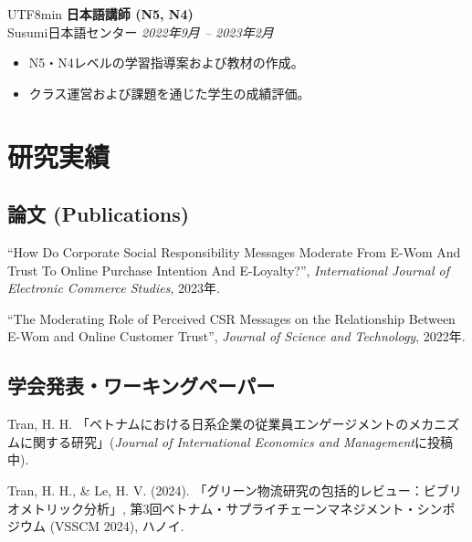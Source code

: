 \documentclass[10.5pt]{article}
\begin{document}
\begin{CJK}{UTF8}{min}
\textbf{日本語講師 (N5, N4)} \hfill \\
Susumi日本語センター \hfill \emph{2022年9月 -- 2023年2月}
\vspace{-0.5em}
\begin{itemize}
\item N5・N4レベルの学習指導案および教材の作成。
\item クラス運営および課題を通じた学生の成績評価。
\end{itemize}


\section{研究実績}

\subsection{論文 (Publications)}

\begin{enumerate}[label={[\arabic*]}]

\item ``How Do Corporate Social Responsibility Messages Moderate From E-Wom And Trust To Online Purchase Intention And E-Loyalty?'', \textit{International Journal of Electronic Commerce Studies}, 2023年.

\item ``The Moderating Role of Perceived CSR Messages on the Relationship Between E-Wom and Online Customer Trust'', \textit{Journal of Science and Technology}, 2022年.

\end{enumerate}

\subsection{学会発表・ワーキングペーパー}

\begin{enumerate}[label={[\arabic*]}]

\item Tran, H. H. 「ベトナムにおける日系企業の従業員エンゲージメントのメカニズムに関する研究」(\textit{Journal of International Economics and Management}に投稿中).

\item Tran, H. H., \& Le, H. V. (2024). 「グリーン物流研究の包括的レビュー：ビブリオメトリック分析」, 第3回ベトナム・サプライチェーンマネジメント・シンポジウム (VSSCM 2024), ハノイ.


\end{enumerate}
\end{CJK}
\end{document}
